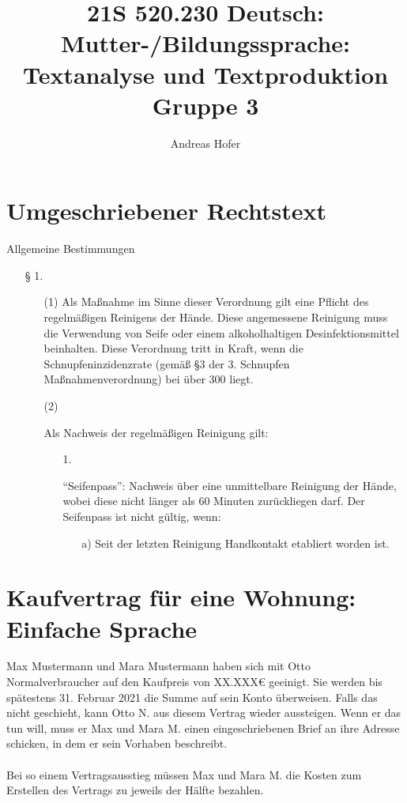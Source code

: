 \documentclass{article}
\title{\vspace{-3cm}21S 520.230 Deutsch: Mutter-/Bildungssprache: Textanalyse und Textproduktion Gruppe 3}
\author{Andreas Hofer}
\begin{document}
\section*{Umgeschriebener Rechtstext}
	Allgemeine Bestimmungen
	\begin{itemize}
		\item[§ 1.]{}
		\item[{}]{
			\begin{itemize}
				\item[(1)]{Als Maßnahme im Sinne dieser Verordnung gilt eine Pflicht des regelmäßigen Reinigens der Hände. Diese angemessene Reinigung muss die Verwendung von Seife oder einem alkoholhaltigen Desinfektionsmittel beinhalten. Diese Verordnung tritt in Kraft, wenn die Schnupfeninzidenzrate (gemäß §3 der 3. Schnupfen Maßnahmenverordnung) bei über 300 liegt.}
				\item[(2)]{Als Nachweis der regelmäßigen Reinigung gilt:
					\begin{itemize}
						\item[1.]{“Seifenpass”: Nachweis über eine unmittelbare Reinigung der Hände, wobei diese nicht länger als 60 Minuten zurückliegen darf. Der Seifenpass ist nicht gültig, wenn:
							\begin{itemize}
								\item[a)]{Seit der letzten Reinigung Handkontakt etabliert worden ist.}
							\end{itemize}}
					\end{itemize}}
			\end{itemize}}
	\end{itemize}
	\newpage

	\section*{Kaufvertrag für eine Wohnung: Einfache Sprache}
	Max Mustermann und Mara Mustermann haben sich mit Otto Normalverbraucher auf den Kaufpreis von XX.XXX€ geeinigt. Sie werden bis spätestens 31. Februar 2021 die Summe auf sein Konto überweisen. Falls das nicht geschieht, kann Otto N. aus diesem Vertrag wieder aussteigen. Wenn er das tun will, muss er Max und Mara M. einen eingeschriebenen Brief an ihre Adresse schicken, in dem er sein Vorhaben beschreibt. \\ \\
	Bei so einem Vertragsausstieg müssen Max und Mara M. die Kosten zum Erstellen des Vertrags zu jeweils der Hälfte bezahlen. \\
	\newpage
\end{document}
